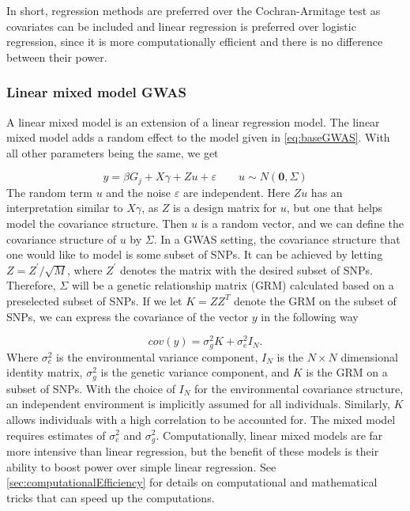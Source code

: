 In short, regression methods are preferred over the Cochran-Armitage test as covariates can be included and linear regression is preferred over logistic regression, since it is more computationally efficient and there is no difference between their power\cite{sikorska2013gwas,prive2019making,balding2006tutorial,de2015magma}.


\subsubsection{Linear mixed model GWAS} 
A linear mixed model is an extension of a linear regression model. The linear mixed model adds a random effect to the model given in \cref{eq:baseGWAS}. With all other parameters being the same, we get


\begin{equation}\label{eq:baseMixedModelGWAS}
y = \beta G_{j} +  X\gamma + Zu + \varepsilon \qquad u \sim N(\mathbf{0}, \Sigma)
\end{equation}
The random term $ u $ and the noise $ \varepsilon $ are independent. Here $ Zu $ has an interpretation similar to $ X\gamma $, as $ 
Z $ is a design matrix for $ u $, but one that helps model the covariance structure. Then $ u $ is a random 
vector, and we can define the covariance structure of $ u $ by $ \Sigma $. In a GWAS setting, the covariance structure that one would like to model is some subset of SNPs. It can be achieved by letting $ Z = Z^{'}/\sqrt{M} $, where $ Z^{'} $ denotes the matrix with the desired subset of SNPs. Therefore, $ \Sigma $ will be a genetic relationship matrix (GRM) calculated based on a preselected subset of SNPs. If we let $ K = ZZ^{T} $ denote the GRM on the subset of SNPs, we can express the covariance of the vector $ y $ in the following way

\begin{equation} \label{eq:MixedModelGWASCovariance}
cov(y) = \sigma_g^2K + \sigma^2_e I_N.
\end{equation}
Where $ \sigma^2_e $ is the environmental variance component, $ I_N $ is the $ N \times N $ dimensional identity matrix, $ \sigma_g^2 $ is the genetic variance component, and $ K $ is the GRM on a subset of SNPs. With the choice of $ I_N $ for the environmental covariance structure, an independent environment is implicitly assumed for all individuals. Similarly, $ K $ allows individuals with a high correlation to be accounted for. The mixed model requires estimates of $ \sigma_e^2 $ and $ \sigma_g^2 $. Computationally, linear mixed models are far more intensive than linear regression, but the benefit of these models is their ability to boost power over simple linear regression. See \cref{sec:computationalEfficiency} for details on computational and mathematical tricks that can speed up the computations.


